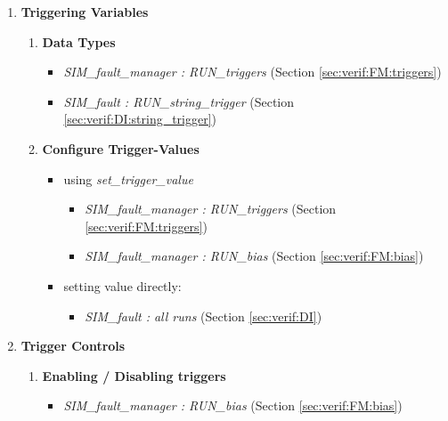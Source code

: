 \documentclass[11pt,fleqn]{report}
\begin{document}
\begin{flushleft}
\begin{enumerate}
   \item \textbf{Triggering Variables}
    \begin{enumerate}
     \item \textbf{Data Types}
      \begin{itemize}
       \item \textit{SIM\_fault\_manager : RUN\_triggers}
         (Section \ref{sec:verif:FM:triggers})
       \item \textit{SIM\_fault : RUN\_string\_trigger}
         (Section \ref{sec:verif:DI:string_trigger})
      \end{itemize}
     \item \textbf{Configure Trigger-Values}
      \begin{itemize}
       \item using \textit{set\_trigger\_value}
        \begin{itemize}
         \item \textit{SIM\_fault\_manager : RUN\_triggers}
           (Section \ref{sec:verif:FM:triggers})
         \item \textit{SIM\_fault\_manager : RUN\_bias}
           (Section \ref{sec:verif:FM:bias})
        \end{itemize}
       \item setting value directly:
        \begin{itemize}
         \item \textit{SIM\_fault : all runs} (Section \ref{sec:verif:DI})
        \end{itemize}
      \end{itemize}
    \end{enumerate}

   \item \textbf{Trigger Controls}
    \begin{enumerate}
     \item \textbf{Enabling / Disabling triggers}
      \begin{itemize}
       \item \textit{SIM\_fault\_manager : RUN\_bias}
        (Section \ref{sec:verif:FM:bias})
      \end{itemize}


\end{enumerate}
\end{enumerate}
\end{flushleft}
\end{document}
